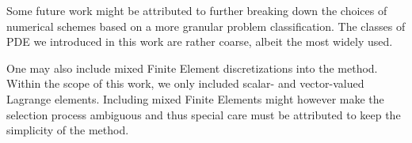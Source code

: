 \documentclass[asi,article,submit,moreauthors]{Definitions/mdpi}
\begin{document}
Some future work might be attributed to further breaking down the choices of numerical schemes based on a more granular problem classification.
The classes of PDE we introduced in this work are rather coarse, albeit the most widely used.

One may also include mixed Finite Element discretizations into the method.
Within the scope of this work, we only included scalar- and vector-valued Lagrange elements.
Including mixed Finite Elements might however make the selection process ambiguous and thus special care must be attributed to keep the simplicity of the method.

\vspace{6pt} 




\end{document}
